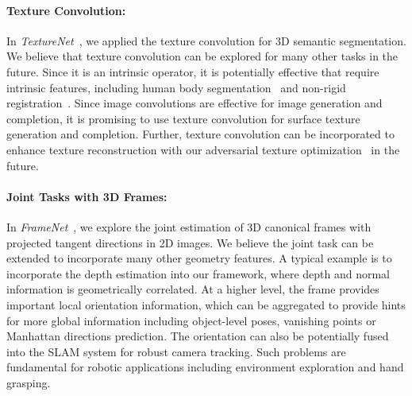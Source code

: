 \paragraph*{Texture Convolution:} In \emph{TextureNet}~\cite{huang2018texturenet}, we applied the texture convolution for 3D semantic segmentation. We believe that texture convolution can be explored for many other tasks in the future. Since it is an intrinsic operator, it is potentially effective that require intrinsic features, including human body segmentation~\cite{maron2017convolutional} and non-rigid registration~\cite{litany2017deep}. Since image convolutions are effective for image generation and completion, it is promising to use texture convolution for surface texture generation and completion. Further, texture convolution can be incorporated to enhance texture reconstruction with our adversarial texture optimization~\cite{huang2020adversarial} in the future.

\paragraph*{Joint Tasks with 3D Frames:} In \emph{FrameNet}~\cite{framenet}, we explore the joint estimation of 3D canonical frames with projected tangent directions in 2D images. We believe the joint task can be extended to incorporate many other geometry features. A typical example is to incorporate the depth estimation into our framework, where depth and normal information is geometrically correlated. At a higher level, the frame provides important local orientation information, which can be aggregated to provide hints for more global information including object-level poses, vanishing points or Manhattan directions prediction. The orientation can also be potentially fused into the SLAM system for robust camera tracking. Such problems are fundamental for robotic applications including environment exploration and hand grasping.
